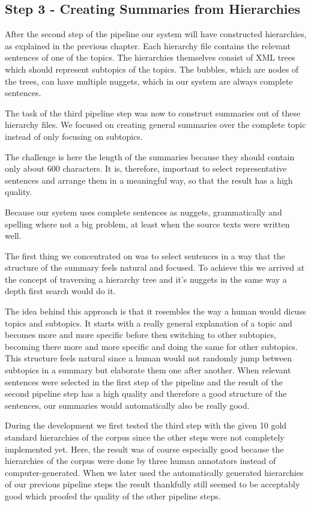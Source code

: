 
\subsection{Step 3 - Creating Summaries from Hierarchies}
After the second step of the pipeline our system will have constructed hierarchies, as explained in the previous chapter. Each hierarchy file contains the relevant sentences of one of the topics. The hierarchies themselves consist of XML trees which should represent subtopics of the topics. The bubbles, which are nodes of the trees, can have multiple nuggets, which in our system are always complete sentences.

The task of the third pipeline step was now to construct summaries out of these hierarchy files. We focused on creating general summaries over the complete topic instead of only focusing on subtopics. 

The challenge is here the length of the summaries because they should contain only about 600 characters. It is, therefore, important to select representative sentences and arrange them in a meaningful way, so that the result has a high quality. 

Because our system uses complete sentences as nuggets, grammatically and spelling
where not a big problem, at least when the source texts were written well.

The first thing we concentrated on was to select sentences in a way that the structure of the summary feels natural and focused. To achieve this we arrived at the concept of traversing a hierarchy tree and it's nuggets in the same way a depth
first search would do it.

The idea behind this approach is that it resembles the way a human would dicuss topics and subtopics. It starts with a really general
explanation of a topic and becomes more and more specific before then switching to other subtopics, becoming there more and more specific and doing the same for other subtopics. This structure feels natural since a human would not randomly jump between subtopics in a summary but elaborate them one after another. When relevant sentences were selected in the first step of the pipeline and the result of the second pipeline step has a high quality and therefore a good structure of the sentences, our summaries would automatically
also be really good.

During the development we first tested the third step with the given 10 gold standard hierarchies of the corpus since the other steps were not completely implemented yet. Here, the result was of course especially good because the hierarchies of the corpus were done by three human annotators instead of computer-generated. When we later used the automatically generated hierarchies of our previous pipeline steps the result thankfully still seemed to be acceptably good which proofed the quality of the other pipeline steps.

